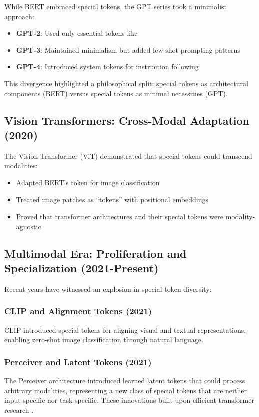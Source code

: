 While BERT embraced special tokens, the GPT series \citep{radford2019language} took a minimalist approach:

\begin{itemize}
\item \textbf{GPT-2}: Used only essential tokens like 
\item \textbf{GPT-3}: Maintained minimalism but added few-shot prompting patterns
\item \textbf{GPT-4}: Introduced system tokens for instruction following
\end{itemize}

This divergence highlighted a philosophical split: special tokens as architectural components (BERT) versus special tokens as minimal necessities (GPT).

\subsection{Vision Transformers: Cross-Modal Adaptation (2020)}

The Vision Transformer (ViT) \citep{dosovitskiy2020image} demonstrated that special tokens could transcend modalities:

\begin{itemize}
\item Adapted BERT's \cls{} token for image classification
\item Treated image patches as ``tokens'' with positional embeddings
\item Proved that transformer architectures and their special tokens were modality-agnostic
\end{itemize}

\subsection{Multimodal Era: Proliferation and Specialization (2021-Present)}

Recent years have witnessed an explosion in special token diversity:

\subsubsection{CLIP and Alignment Tokens (2021)}
CLIP \citep{radford2021learning} introduced special tokens for aligning visual and textual representations, enabling zero-shot image classification through natural language.

\subsubsection{Perceiver and Latent Tokens (2021)}
The Perceiver architecture introduced learned latent tokens that could process arbitrary modalities, representing a new class of special tokens that are neither input-specific nor task-specific. These innovations built upon efficient transformer research \citep{tay2022efficient}.

